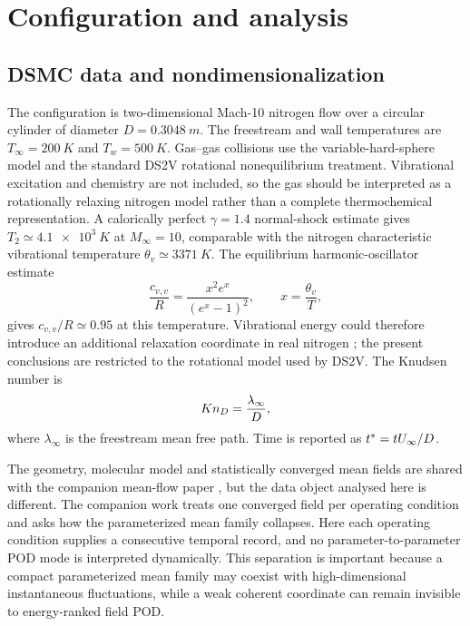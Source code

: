 \section{Configuration and analysis}
\subsection{DSMC data and nondimensionalization}
The configuration is two-dimensional Mach-10 nitrogen flow over a circular cylinder of diameter $D=\SI{0.3048}{m}$. The freestream and wall temperatures are $T_\infty=\SI{200}{K}$ and $T_w=\SI{500}{K}$. Gas--gas collisions use the variable-hard-sphere model and the standard DS2V rotational nonequilibrium treatment. Vibrational excitation and chemistry are not included, so the gas should be interpreted as a rotationally relaxing nitrogen model rather than a complete thermochemical representation. A calorically perfect $\gamma=1.4$ normal-shock estimate gives $T_2\simeq\SI{4.1e3}{K}$ at $M_\infty=10$, comparable with the nitrogen characteristic vibrational temperature $\theta_v\simeq\SI{3371}{K}$. The equilibrium harmonic-oscillator estimate
\begin{equation}
 \frac{c_{v,v}}{R}=\frac{x^2e^x}{(e^x-1)^2},\qquad x=\frac{\theta_v}{T},
\end{equation}
gives $c_{v,v}/R\simeq0.95$ at this temperature. Vibrational energy could therefore introduce an additional relaxation coordinate in real nitrogen \citep{MillikanWhite1963,Park1988,Bertolotti1998}; the present conclusions are restricted to the rotational model used by DS2V. The Knudsen number is
\begin{equation}
 Kn_D=\frac{\lambda_\infty}{D},
\end{equation}
where $\lambda_\infty$ is the freestream mean free path. Time is reported as $t^*=tU_\infty/D$.

The geometry, molecular model and statistically converged mean fields are shared with the companion mean-flow paper \citep{RoohiShoja2026Mean}, but the data object analysed here is different. The companion work treats one converged field per operating condition and asks how the parameterized mean family collapses. Here each operating condition supplies a consecutive temporal record, and no parameter-to-parameter POD mode is interpreted dynamically. This separation is important because a compact parameterized mean family may coexist with high-dimensional instantaneous fluctuations, while a weak coherent coordinate can remain invisible to energy-ranked field POD.

